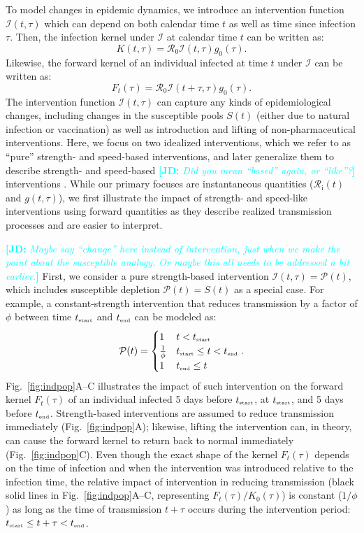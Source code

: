 \documentclass[12pt]{article}
\newcommand{\comment}{\showcomment}
\newcommand{\showcomment}[3]{\textcolor{#1}{\textbf{[#2: }\textsl{#3}\textbf{]}}}
\newcommand{\jd}[1]{\comment{cyan}{JD}{#1}}
\newcommand{\fref}[1]{Fig.~\ref{fig:#1}}
\newcommand{\Rx}[1]{\ensuremath{{\mathcal R}_{#1}}\xspace}
\newcommand{\Ro}{\Rx{0}}
\newcommand{\Ri}{\Rx{\mathrm{i}}}
\newcommand{\tsub}[2]{#1_{{\textrm{\tiny #2}}}}
\newcommand{\tstart}{\ensuremath{\tsub{t}{start}}\xspace}
\newcommand{\tend}{\ensuremath{\tsub{t}{end}}\xspace}
\newcommand{\PP}{\ensuremath{\mathcal P}}
\newcommand{\II}{\ensuremath{\mathcal I}}
\begin{document}
To model changes in epidemic dynamics, we introduce an intervention function $\II(t, \tau)$ which can depend on both calendar time $t$ as well as time since infection $\tau$. 
Then, the infection kernel under $\II$ at calendar time $t$ can be written as:
\begin{equation}
K(t, \tau) = \Ro \II(t, \tau) g_0(\tau).
\end{equation}
Likewise, the forward kernel of an individual infected at time $t$ under $\II$ can be written as:
\begin{equation}
F_t(\tau) =  \Ro \II(t + \tau, \tau) g_0(\tau).
\end{equation}
The intervention function $\II(t, \tau)$ can capture any kinds of epidemiological changes, including changes in the susceptible pools $S(t)$ (either due to natural infection or vaccination) as well as introduction and lifting of non-pharmaceutical interventions.
Here, we focus on two idealized interventions, which we refer to as ``pure'' strength- and speed-based interventions, and later generalize them to describe strength- and speed-based \jd{Did you mean ``based'' again, or ``like''?} interventions \citep{dushoff2021speed}.
While our primary focuses are instantaneous quantities ($\Ri(t)$ and $g(t, \tau)$), we first illustrate the impact of strength- and speed-like interventions using forward quantities as they describe realized transmission processes and are easier to interpret.

\jd{Maybe say ``change'' here instead of intervention, just when we make the point about the susceptible analogy. Or maybe this all needs to be addressed a bit earlier.} First, we consider a pure strength-based intervention $\II(t, \tau) = \PP(t)$, which includes susceptible depletion $\PP(t) = S(t)$ as a special case.
For example, a constant-strength intervention that reduces transmission by a factor of $\phi$ between time \tstart and \tend can be modeled as:
\begin{equation}
\PP(t) = \begin{cases}
1 & t < \tstart\\
\frac{1}{\phi} & \tstart \leq t < \tend\\
1 & \tend \leq t
\end{cases}.
\end{equation}
\fref{indpop}A--C illustrates the impact of such intervention on the forward kernel $F_t(\tau)$ of an individual infected 5 days before $\tstart$, at $\tstart$, and 5 days before $\tend$.
Strength-based interventions are assumed to reduce transmission immediately (\fref{indpop}A);
likewise, lifting the intervention can, in theory, can cause the forward kernel to return back to normal immediately (\fref{indpop}C).
Even though the exact shape of the kernel $F_t(\tau)$ depends on the time of infection and when the intervention was introduced relative to the infection time, the relative impact of intervention in reducing transmission (black solid lines in \fref{indpop}A--C, representing $F_t(\tau)/K_0(\tau)$) is constant ($1/\phi$) as long as the time of transmission $t+\tau$ occurs during the intervention period: $\tstart \leq t+\tau < \tend$.
\end{document}
